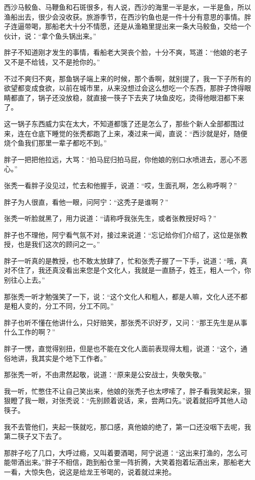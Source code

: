 西沙马鲛鱼、马鞭鱼和石斑很多，有人说，西沙的海里一半是水，一半是鱼，所以渔船出去，很少会没收获。旅游季节，在西沙钓鱼也是一件十分有意思的事情。胖子连逼带喝，那船老大十分不情愿，还是从渔箱里提出来一条大马鲛鱼，交给一个伙计，说：“拿个鱼头锅出来。”

胖子不知道刚才发生的事情，看船老大哭丧个脸，十分不爽，骂道：“他娘的老子又不是不给钱，又不是抢你的。”

不过不爽归不爽，那鱼锅子端上来的时候，那个香啊，就别提了，我一下子所有的欲望都变成食欲，以前在城市里，从来没想过会这么想吃一个东西，那胖子馋得眼睛都直了，锅子还没放稳，就直接一筷子下去夹了块鱼皮吃，烫得他眼泪都下来了。

这一锅子东西威力实在太大，不知道都饿了还是怎么了，那些个新人全部都围过来，连在仓底下睡觉的张秃都跑了上来，凑过来一闻，直说：“西沙就是好，随便烧个鱼我们那里一辈子都吃不到。”

胖子一把把他拉远，大骂：“拍马屁归拍马屁，你他娘的别口水喷进去，恶心不恶心。”

张秃一看胖子没见过，忙去和他握手，说道：“哎，生面孔啊，怎么称呼啊？”

胖子为人很直，看他一眼，问阿宁：“这秃子是谁啊？”

张秃一听脸就黑了，用力说道：“请称呼我张先生，或者张教授好吗？”

胖子也不理他，阿宁看气氛不对，接过来说道：“忘记给你们介绍了，这位是张教授，也是我们这次的顾问之一。”

胖子一听真的是教授，也不敢太放肆了，忙和张秃子握了一下手，说道：“哦，真对不住了，我还真没看出来您是个文化人，我就是一直肠子，姓王，粗人一个，你别往心上去。”

那张秃一听才勉强笑了一下，说：“这个文化人和粗人，都是人嘛，文化人还不都是粗人变的，分工不同，分工不同。”

胖子也听不懂在他讲什么，只好赔笑，那张秃不识好歹，又问：“那王先生是从事什么工作的啊？”

胖子一愣，直觉得别扭，但是也不能在文化人面前表现得太粗，说道：“这个，通俗地讲，我其实是个地下工作者。”

那张秃一听，不由肃然起敬，说道：“原来是公安战士，失敬失敬。”

我一听，忙憋住不让自己笑出来，他娘的张秃子也太啰嗦了，胖子看我笑起来，狠狠瞪了我一眼，对张秃说：“先别顾着说话，来，尝两口先。”说着就招呼其他人动筷子。

我不去管他们，夹起一筷就吃，那口感，真他娘的绝了，第一口还没咽下去呢，我第二筷子又下去了。

那胖子吃了几口，大呼过瘾，又叫着要酒喝，阿宁说道：“这出来打渔的，怎么可能带酒出来。”胖子不相信，跑到船仓里一阵折腾，大笑着抱着坛酒出来，那船老大一看，大惊失色，说这是给龙王爷喝的，说着就过来抢。

